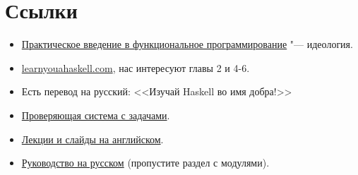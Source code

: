 \section{Ссылки}

\begin{frame}
	\begin{itemize}
		\item
			\href{https://maryrosecook.com/blog/post/a-practical-introduction-to-functional-programming}{Практическое введение в функциональное программирование} "--- идеология.
		\item
			\href{http://learnyouahaskell.com}{learnyouahaskell.com}, нас интересуют главы 2 и 4-6.
		\item
			Есть перевод на русский: <<Изучай Haskell во имя добра!>>
		\item
			\href{http://camlback.cs.ucla.edu}{Проверяющая система с задачами}.
		\item
			\href{https://www.inf.ed.ac.uk/teaching/courses/inf1/fp/}{Лекции и слайды на английском}.
		\item
			\href{https://www.ohaskell.guide/whales-n-turtle.html}{Руководство на русском} (пропустите раздел с модулями).
	\end{itemize}
\end{frame}
